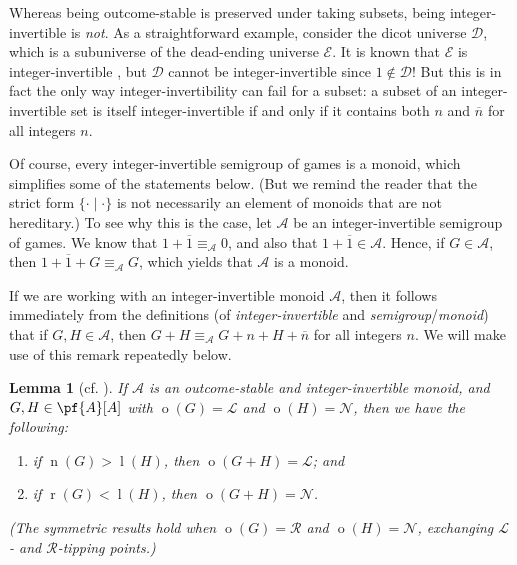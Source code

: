 \documentclass[11pt]{article}
\newtheorem{lemma}[theorem]{Lemma}
\theoremstyle{definition}
\DeclareMathOperator{\outcome}{o}
\newcommand{\set}[1]{\mathcal{#1}}
\DeclareMathOperator{\ltp}{l}
\DeclareMathOperator{\ntp}{n}
\DeclareMathOperator{\rtp}{r}
\begin{document}
Whereas being outcome-stable is preserved under taking subsets, being
integer-invertible is \emph{not}. As a straightforward example, consider the
dicot universe $\set{D}$, which is a subuniverse of the dead-ending universe
$\set{E}$. It is known that $\set{E}$ is integer-invertible \cite[Theorem 19 on
p.~11]{milley.renault:invertible}, but $\set{D}$ cannot be integer-invertible
since $1\notin\set{D}$! But this is in fact the only way integer-invertibility
can fail for a subset: a subset of an integer-invertible set is itself
integer-invertible if and only if it contains both $n$ and $\overline{n}$ for
all integers $n$.

Of course, every integer-invertible semigroup of games is a monoid, which
simplifies some of the statements below. (But we remind the reader that the
strict form $\{\cdot\mid\cdot\}$ is not necessarily an element of monoids that
are not hereditary.) To see why this is the case, let $\set{A}$ be an
integer-invertible semigroup of games. We know that
$1+\overline{1}\equiv_\set{A}0$, and also that $1+\overline{1}\in\set{A}$.
Hence, if $G\in\set{A}$, then $1+\overline{1}+G\equiv_\set{A}G$, which yields
that $\set{A}$ is a monoid.

If we are working with an integer-invertible monoid $\set{A}$, then it follows
immediately from the definitions (of \emph{integer-invertible} and
\emph{semigroup}/\emph{monoid}) that if $G,H\in\set{A}$, then
$G+H\equiv_\set{A}G+n+H+\overline{n}$ for all integers $n$. We will make use of
this remark repeatedly below.

\begin{lemma}[cf. {\cite[Lemmas 11--12 on p.~7]{milley.renault:invertible}}]
    \label{lem:11}
    If $\set{A}$ is an outcome-stable and integer-invertible monoid, and
    $G,H\in\pf{A}[A]$ with $\outcome(G)=\mathscr{L}$ and
    $\outcome(H)=\mathscr{N}$, then we have the following:
    \begin{enumerate}
        \item
            if $\ntp(G)>\ltp(H)$, then $\outcome(G+H)=\mathscr{L}$; and
        \item
            if $\rtp(G)<\ltp(H)$, then $\outcome(G+H)=\mathscr{N}$.
    \end{enumerate}
    (The symmetric results hold when $\outcome(G)=\mathscr{R}$ and
    $\outcome(H)=\mathscr{N}$, exchanging $\mathscr{L}$- and
    $\mathscr{R}$-tipping points.)
\end{lemma}
\end{document}
